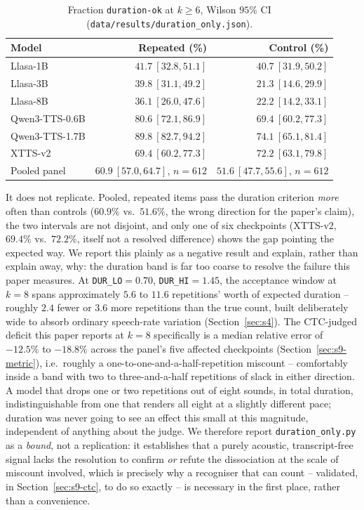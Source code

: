 \documentclass[11pt]{article}
\begin{document}
\begin{table}[h]
\centering
\caption{Fraction \texttt{duration-ok} at $k\ge6$, Wilson $95\%$ CI
(\texttt{data/results/duration\_only.json}).}
\label{tab:duronly}
\small
\begin{tabular}{@{}lrr@{}}
\toprule
Model & Repeated (\%) & Control (\%) \\
\midrule
Llasa-1B & $41.7\ [32.8,51.1]$ & $40.7\ [31.9,50.2]$ \\
Llasa-3B & $39.8\ [31.1,49.2]$ & $21.3\ [14.6,29.9]$ \\
Llasa-8B & $36.1\ [26.0,47.6]$ & $22.2\ [14.2,33.1]$ \\
Qwen3-TTS-0.6B & $80.6\ [72.1,86.9]$ & $69.4\ [60.2,77.3]$ \\
Qwen3-TTS-1.7B & $89.8\ [82.7,94.2]$ & $74.1\ [65.1,81.4]$ \\
XTTS-v2 & $69.4\ [60.2,77.3]$ & $72.2\ [63.1,79.8]$ \\
\midrule
Pooled panel & $60.9\ [57.0,64.7]$, $n{=}612$ & $51.6\ [47.7,55.6]$, $n{=}612$ \\
\bottomrule
\end{tabular}
\end{table}

It does not replicate. Pooled, repeated items pass the duration criterion
\emph{more} often than controls ($60.9\%$ vs.\ $51.6\%$, the wrong direction
for the paper's claim), the two intervals are not disjoint, and only one of
six checkpoints (XTTS-v2, $69.4\%$ vs.\ $72.2\%$, itself not a resolved
difference) shows the gap pointing the expected way. We report this plainly
as a negative result and explain, rather than explain away, why: the
duration band is far too coarse to resolve the failure this paper measures.
At \texttt{DUR\_LO}$=0.70$, \texttt{DUR\_HI}$=1.45$, the acceptance window at
$k{=}8$ spans approximately $5.6$ to $11.6$ repetitions' worth of expected
duration -- roughly $2.4$ fewer or $3.6$ more repetitions than the true
count, built deliberately wide to absorb ordinary speech-rate variation
(Section~\ref{sec:s4}). The CTC-judged deficit this paper reports at
$k{=}8$ specifically is a median relative error of $-12.5\%$ to $-18.8\%$
across the panel's five affected checkpoints (Section~\ref{sec:s9-metric}),
i.e.\ roughly a one-to-one-and-a-half-repetition miscount -- comfortably
inside a band with two to three-and-a-half repetitions of slack in either
direction. A model that drops one or two repetitions out of eight sounds, in
total duration, indistinguishable from one that renders all eight at a
slightly different pace; duration was never going to see an effect this
small at this magnitude, independent of anything about the judge. We
therefore report \texttt{duration\_only.py} as a \emph{bound}, not a
replication: it establishes that a purely acoustic, transcript-free signal
lacks the resolution to confirm \emph{or} refute the dissociation at the
scale of miscount involved, which is precisely why a recogniser that can
count -- validated, in Section~\ref{sec:s9-ctc}, to do so exactly -- is
necessary in the first place, rather than a convenience.
\end{document}

